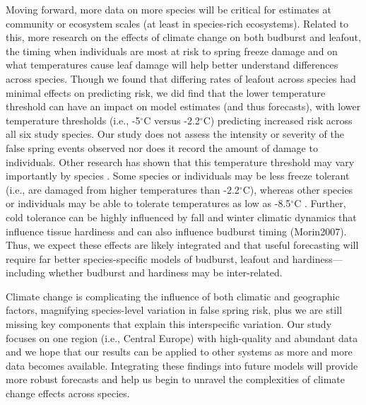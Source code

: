 \documentclass{article}\usepackage[]{graphicx}\usepackage[]{color}
\begin{document}
Moving forward, more data on more species will be critical for estimates at community or ecosystem scales (at least in species-rich ecosystems). Related to this, more research on the effects of climate change on both budburst and leafout, the timing when individuals are most at risk to spring freeze damage \citep{Chamberlain2019,Lenz2016} and on what temperatures cause leaf damage will help better understand differences across species. Though we found that differing rates of leafout across species had minimal effects on predicting risk, we did find that the lower temperature threshold can have an impact on model estimates (and thus forecasts), with lower temperature thresholds (i.e., -5$^{\circ}$C versus -2.2$^{\circ}$C) predicting increased risk across all six study species. Our study does not assess the intensity or severity of the false spring events observed nor does it record the amount of damage to individuals. Other research has shown that this temperature threshold may vary importantly by species \citep{Korner2016, Lenz2013, Zhuo2018,bennett2018globtherm}. Some species or individuals may be less freeze tolerant (i.e., are damaged from higher temperatures than -2.2$^{\circ}$C), whereas other species or individuals may be able to tolerate temperatures as low as -8.5$^{\circ}$C \citep{Lenz2016}. Further, cold tolerance can be highly influenced by fall and winter climatic dynamics that influence tissue hardiness \citep{Hofmann2015, Vitasse2014, Charrier2011} and can also influence budburst timing (Morin2007). Thus, we expect these effects are likely integrated and that useful forecasting will require far better species-specific models of budburst, leafout and hardiness---including whether budburst and hardiness may be inter-related. %

Climate change is complicating the influence of both climatic and geographic factors, magnifying species-level variation in false spring risk, plus we are still missing key components that explain this interspecific variation. Our study focuses on one region (i.e., Central Europe) with high-quality and abundant data and we hope that our results can be applied to other systems as more and more data becomes available. Integrating these findings into future models will provide more robust forecasts and help us begin to unravel the complexities of climate change effects across species.


\end{document}
